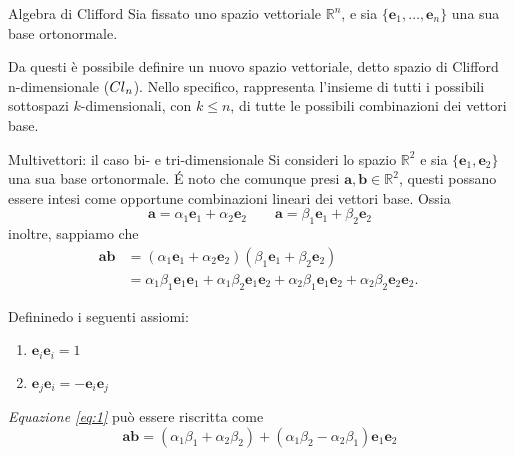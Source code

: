 \begin{frame}{Algebra di Clifford}
    Sia fissato uno spazio vettoriale \(\mathbb{R}^{n}\), e sia 
    \(\{\mathbf{e}_{1}, \ldots, \mathbf{e}_{n}\}\) una sua base ortonormale.

    Da questi è possibile definire un nuovo spazio vettoriale,
    detto spazio di Clifford n-dimensionale (\(\Clifford\)).
    Nello specifico, \Clifford rappresenta l'insieme di tutti i 
    possibili sottospazi \(k\)-dimensionali, con \(k \le n\), 
    di tutte le possibili combinazioni dei vettori base.
\end{frame}
\begin{frame}{Multivettori: il caso bi- e tri-dimensionale}
    Si consideri lo spazio \(\mathbb{R}^{2}\) e sia \(\{\mathbf{e}_{1}, 
    \mathbf{e}_{2}\}\) una sua base ortonormale. 
    \'E noto che comunque presi \(\mathbf{a}, \mathbf{b} \in \mathbb{R}^{2}\),
    questi possano essere intesi come opportune combinazioni lineari dei vettori 
    base. Ossia
    \[
        \mathbf{a} = \alpha_{1}\mathbf{e}_{1} + \alpha_{2}\mathbf{e}_{2} 
        \qquad \mathbf{a} = \beta_{1}\mathbf{e}_{1} + \beta_{2}\mathbf{e}_{2}
    \]
    inoltre, sappiamo che 
    \begin{equation}\label{eq:1}
        \begin{aligned}
        \mathbf{ab} & = 
            (\alpha_{1}\mathbf{e}_{1} + \alpha_{2}\mathbf{e}_{2})
            (\beta_{1}\mathbf{e}_{1} + \beta_{2}\mathbf{e}_{2}) \\
            & = \alpha_{1}\beta_{1}\mathbf{e}_{1}\mathbf{e}_{1} +
                \alpha_{1}\beta_{2}\mathbf{e}_{1}\mathbf{e}_{2} +
                \alpha_{2}\beta_{1}\mathbf{e}_{1}\mathbf{e}_{2} + 
                \alpha_{2}\beta_{2}\mathbf{e}_{2}\mathbf{e}_{2}.
        \end{aligned}\
    \end{equation}
\end{frame}
\begin{frame}
    Defininedo i seguenti assiomi:
    \begin{enumerate}
        \item \(\mathbf{e}_{i}\mathbf{e}_{i} = 1\)
        \item \(\mathbf{e}_{j}\mathbf{e}_{i} = - \mathbf{e}_{i}\mathbf{e}_{j}\)
    \end{enumerate}
    \emph{Equazione \eqref{eq:1}} può essere riscritta come 
    \[
        \mathbf{ab} = (\alpha_{1}\beta_{1} + \alpha_{2}\beta_{2})
            + (\alpha_{1}\beta_{2} - \alpha_{2}\beta_{1})\mathbf{e}_{1}\mathbf{e}_{2}
    \]
\end{frame}
